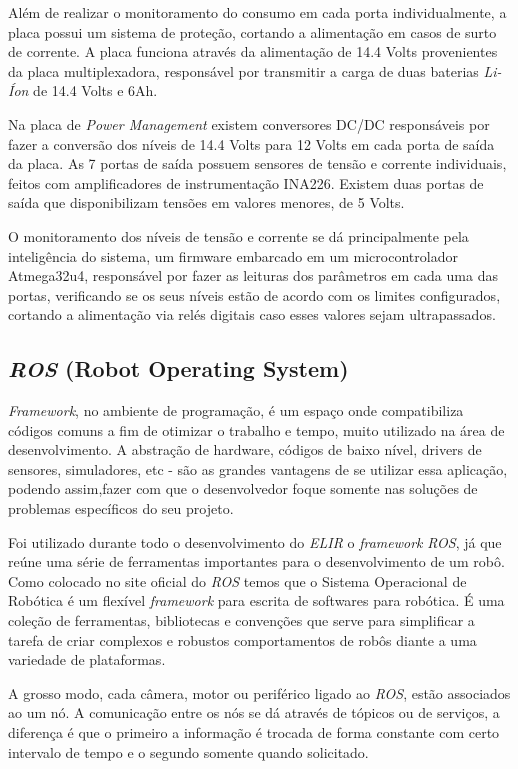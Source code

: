 Além de realizar o monitoramento do consumo em cada porta individualmente, a placa possui um sistema de proteção, cortando a alimentação em casos de surto de corrente. A placa funciona através da alimentação de 14.4 Volts provenientes da placa multiplexadora, responsável por transmitir a carga de duas baterias \textit{Li-Íon} de 14.4 Volts e 6Ah.

Na placa de \textit{Power Management} existem conversores DC/DC responsáveis por fazer a conversão dos níveis de 14.4 Volts para 12 Volts em cada porta de saída da placa. As 7 portas de saída  possuem sensores de tensão e corrente individuais, feitos com amplificadores de instrumentação INA226. Existem duas portas de saída que disponibilizam tensões em valores menores, de 5 Volts. 

O monitoramento dos níveis de tensão e corrente se dá principalmente pela inteligência do sistema, um firmware embarcado em um microcontrolador Atmega32u4, responsável por fazer as leituras dos parâmetros em cada uma das portas, verificando se os seus níveis estão de acordo com os limites configurados, cortando a alimentação via relés digitais caso esses valores sejam ultrapassados.

\subsection{\textit{ROS} (Robot Operating System)}
\textit{Framework}, no ambiente de programação, é um espaço onde compatibiliza códigos comuns a fim de otimizar o trabalho e tempo, muito utilizado na área de desenvolvimento. A abstração de hardware, códigos de baixo nível, drivers de sensores, simuladores, etc - são as grandes vantagens de se utilizar essa aplicação, podendo assim,fazer com que o desenvolvedor foque somente nas soluções de problemas específicos do seu projeto.

Foi utilizado durante todo o desenvolvimento do \textit{ELIR} o \textit{framework} \textit{ROS}, já que reúne uma série de ferramentas importantes para o desenvolvimento de um robô. Como colocado no site oficial do \textit{ROS} temos que o Sistema Operacional de Robótica é um flexível \textit{framework} para escrita de softwares para robótica. É uma coleção de ferramentas, bibliotecas e convenções que serve para simplificar a tarefa de criar complexos e robustos comportamentos de robôs diante a uma variedade de plataformas. 

A grosso modo, cada câmera, motor ou periférico ligado ao \textit{ROS}, estão associados ao um nó. A comunicação entre os nós se dá através de tópicos ou de serviços, a diferença é que o primeiro a informação é trocada de forma constante com certo intervalo de tempo e o segundo somente quando solicitado.

